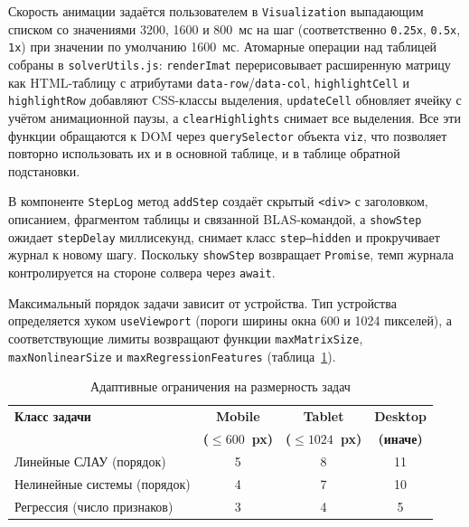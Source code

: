 \documentclass[12pt, oneside]{book}
\begin{document}
    \quad Скорость анимации задаётся пользователем в \texttt{Visualization} выпадающим списком со значениями 3200, 1600 и 800~мс на шаг (соответственно \texttt{0.25x}, \texttt{0.5x}, \texttt{1x}) при значении по умолчанию 1600~мс. Атомарные операции над таблицей собраны в \texttt{solverUtils.js}: \texttt{renderImat} перерисовывает расширенную матрицу как HTML-таблицу с атрибутами \texttt{data-row}/\texttt{data-col}, \texttt{highlightCell} и \texttt{highlightRow} добавляют CSS-классы выделения, \texttt{updateCell} обновляет ячейку с учётом анимационной паузы, а \texttt{clearHighlights} снимает все выделения. Все эти функции обращаются к DOM через \texttt{querySelector} объекта \texttt{viz}, что позволяет повторно использовать их и в основной таблице, и в таблице обратной подстановки.

    \quad В компоненте \texttt{StepLog} метод \texttt{addStep} создаёт скрытый \texttt{<div>} с заголовком, описанием, фрагментом таблицы и связанной BLAS-командой, а \texttt{showStep} ожидает \texttt{stepDelay} миллисекунд, снимает класс \texttt{step--hidden} и прокручивает журнал к новому шагу. Поскольку \texttt{showStep} возвращает \texttt{Promise}, темп журнала контролируется на стороне солвера через \texttt{await}.

    \quad Максимальный порядок задачи зависит от устройства. Тип устройства определяется хуком \texttt{useViewport} (пороги ширины окна 600 и 1024 пикселей), а соответствующие лимиты возвращают функции \texttt{maxMatrixSize},\\ \texttt{maxNonlinearSize} и \texttt{maxRegressionFeatures} (таблица~\ref{tab:adaptive_limits}).

\begin{table}[!htbp]
\centering
\scriptsize
\renewcommand{\arraystretch}{1.15}
\begin{tabular}{|p{5.5cm}|c|c|c|}
\hline
\rowcolor{thbg} \textbf{Класс задачи} & \textbf{Mobile} & \textbf{Tablet} & \textbf{Desktop} \\
\rowcolor{thbg} & \textbf{($\le600$~px)} & \textbf{($\le1024$~px)} & \textbf{(иначе)} \\
\hline
Линейные СЛАУ (порядок) & 5 & 8 & 11 \\
\hline
Нелинейные системы (порядок) & 4 & 7 & 10 \\
\hline
Регрессия (число признаков) & 3 & 4 & 5 \\
\hline
\end{tabular}
\caption{Адаптивные ограничения на размерность задач}
\label{tab:adaptive_limits}
\end{table}
\end{document}
